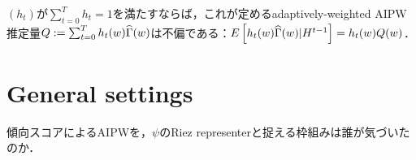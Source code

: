 \documentclass[uplatex,dvipdfmx]{jsreport}
\begin{document}
\begin{lemma}
    $(h_t)$が$\sum^T_{t=0}h_t=1$を満たすならば，これが定めるadaptively-weighted AIPW推定量$Q:=\sum_{t=0}^Th_t(w)\widehat{\Gamma}(w)$は不偏である：$E\left[h_t(w)\widehat{\Gamma}(w)|H^{t-1}\right]=h_t(w)Q(w)$．
\end{lemma}

\section{General settings}

\begin{tcolorbox}[colframe=ForestGreen, colback=ForestGreen!10!white,breakable,colbacktitle=ForestGreen!40!white,coltitle=black,fonttitle=\bfseries\sffamily,
    title=]
    傾向スコアによるAIPWを，$\psi$のRiez representerと捉える枠組みは誰が気づいたのか．
\end{tcolorbox}
\end{document}
